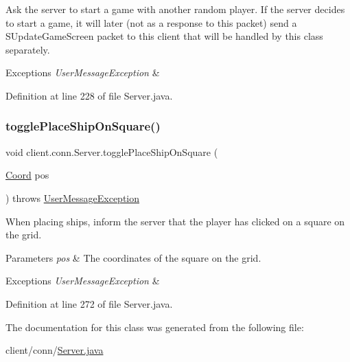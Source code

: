 Ask the server to start a game with another random player. If the server decides to start a game, it will later (not as a response to this packet) send a S\+Update\+Game\+Screen packet to this client that will be handled by this class separately. 
\begin{DoxyExceptions}{Exceptions}
{\em User\+Message\+Exception} & \\
\hline
\end{DoxyExceptions}


Definition at line 228 of file Server.\+java.

\hypertarget{classclient_1_1conn_1_1_server_a9894c54137e6f203dd38a47fe3514c27}{}\label{classclient_1_1conn_1_1_server_a9894c54137e6f203dd38a47fe3514c27} 
\subsubsection{\texorpdfstring{toggle\+Place\+Ship\+On\+Square()}{togglePlaceShipOnSquare()}}
{\footnotesize\ttfamily void client.\+conn.\+Server.\+toggle\+Place\+Ship\+On\+Square (\begin{DoxyParamCaption}\item[{\hyperlink{classpt_1_1up_1_1fe_1_1lpro1613_1_1sharedlib_1_1utils_1_1_coord}{Coord}}]{pos }\end{DoxyParamCaption}) throws \hyperlink{classpt_1_1up_1_1fe_1_1lpro1613_1_1sharedlib_1_1exceptions_1_1_user_message_exception}{User\+Message\+Exception}}

When placing ships, inform the server that the player has clicked on a square on the grid. 
\begin{DoxyParams}{Parameters}
{\em pos} & The coordinates of the square on the grid. \\
\hline
\end{DoxyParams}

\begin{DoxyExceptions}{Exceptions}
{\em User\+Message\+Exception} & \\
\hline
\end{DoxyExceptions}


Definition at line 272 of file Server.\+java.



The documentation for this class was generated from the following file\+:\begin{DoxyCompactItemize}
\item 
client/conn/\hyperlink{_server_8java}{Server.\+java}\end{DoxyCompactItemize}
